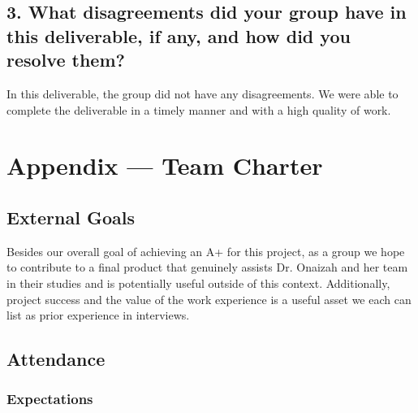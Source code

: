 \documentclass{article}
\begin{document}
\subsection*{3. What disagreements did your group have in this deliverable, if any, and how did you resolve them?}
In this deliverable, the group did not have any disagreements. We were able to complete the deliverable in a timely manner and with a high quality of work.

\newpage{}

\section*{Appendix --- Team Charter}

\iffalse
\wss{borrows from
\href{https://engineering.up.edu/industry_partnerships/files/team-charter.pdf}
{University of Portland Team Charter}}
\fi

\subsection*{External Goals}

\iffalse
\wss{What are your team's external goals for this project? These are not the
goals related to the functionality or quality fo the project.  These are the
goals on what the team wishes to achieve with the project.  Potential goals are
to win a prize at the Capstone EXPO, or to have something to talk about in
interviews, or to get an A+, etc.}
\fi

Besides our overall goal of achieving an A+ for this project, as a group we hope to 
contribute to a final product that genuinely assists Dr. Onaizah and her team in their 
studies and is potentially useful outside of this context. Additionally, project success 
and the value of the work experience is a useful asset we each can list as prior 
experience in interviews. 

\subsection*{Attendance}

\subsubsection*{Expectations}

\iffalse
\wss{What are your team's expectations regarding meeting attendance (being on
time, leaving early, missing meetings, etc.)?}
\fi
\end{document}
